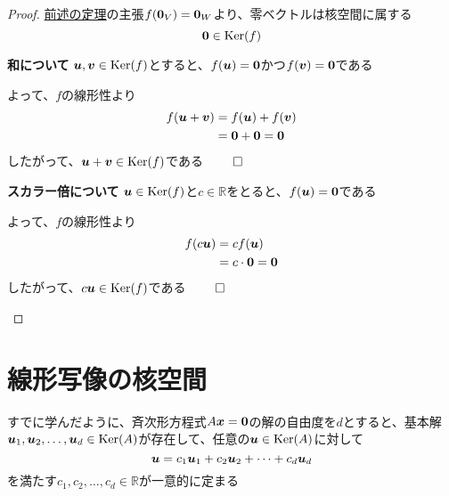 \documentclass[../../../topic_linear-algebra]{subfiles}
\begin{document}
\begin{proof}
  \hyperref[thm:linear-map-zero-preserving]{前述の定理}の主張$f(\vb*{0}_V) = \vb*{0}_W$より、零ベクトルは核空間に属する
  \begin{equation*}
    \vb*{0} \in \operatorname{Ker}(f)
  \end{equation*}

  \begin{subpattern}{\bfseries 和について}
    $\vb*{u}, \vb*{v} \in \operatorname{Ker}(f)$とすると、$f(\vb*{u}) = \vb*{0}$かつ$f(\vb*{v}) = \vb*{0}$である

    よって、$f$の線形性より
    \begin{align*}
      f(\vb*{u} + \vb*{v}) & = f(\vb*{u}) + f(\vb*{v})     \\
                           & = \vb*{0} + \vb*{0} = \vb*{0}
    \end{align*}
    したがって、$\vb*{u} + \vb*{v} \in \operatorname{Ker}(f)$である $\qed$

  \end{subpattern}

  \begin{subpattern}{\bfseries スカラー倍について}
    $\vb*{u} \in \operatorname{Ker}(f)$と$c \in \mathbb{R}$をとると、$f(\vb*{u}) = \vb*{0}$である

    よって、$f$の線形性より
    \begin{align*}
      f(c \vb*{u}) & = c f(\vb*{u})              \\
                   & = c \cdot \vb*{0} = \vb*{0}
    \end{align*}
    したがって、$c \vb*{u} \in \operatorname{Ker}(f)$である $\qed$
  \end{subpattern}
\end{proof}

\sectionline
\section{線形写像の核空間}

すでに学んだように、斉次形方程式$A\vb*{x} = \vb*{0}$の解の自由度を$d$とすると、基本解$\vb*{u}_1, \vb*{u}_2, \dots, \vb*{u}_d \in \operatorname{Ker}(A)$が存在して、任意の$\vb*{u} \in \operatorname{Ker}(A)$に対して
\begin{equation*}
  \vb*{u} = c_1 \vb*{u}_1 + c_2 \vb*{u}_2 + \cdots + c_d \vb*{u}_d
\end{equation*}
を満たす$c_1, c_2, \dots, c_d \in \mathbb{R}$が一意的に定まる

\br

\end{document}
